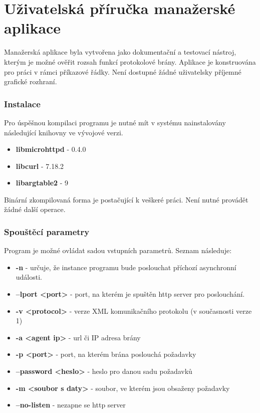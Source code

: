 \chapter{Uživatelská příručka manažerské aplikace}
\label{kap_uzivatelska_prirucka_manazer}
Manažerská aplikace byla vytvořena jako dokumentační a testovací nástroj, kterým je možné
ověřit rozsah funkcí protokolové brány. Aplikace je konstruována pro práci v rámci
příkazové řádky. Není dostupné žádné uživatelsky příjemné grafické rozhraní.

\subsection*{Instalace}
Pro úspěšnou kompilaci programu je nutné mít v systému nainstalovány následující knihovny ve vývojové verzi.
\begin{itemize}
	\item \textbf{libmicrohttpd} - 0.4.0
	\item \textbf{libcurl} - 7.18.2
	\item \textbf{libargtable2} - 9
\end{itemize}

Binární zkompilovaná forma je postačující k veškeré práci. Není nutné provádět žádné další operace.

\subsection*{Spouštěcí parametry}
Program je možné ovládat sadou vstupních parametrů. Seznam následuje:
\begin{itemize}
	\item \textbf{-n} - určuje, že instance programu bude poslouchat příchozí asynchronní události.
	\item \textbf{--lport <port>} - port, na kterém je spuštěn http server pro poslouchání.
	\item \textbf{-v <protocol>} - verze XML komunikačního protokolu (v současnosti verze 1)
	\item \textbf{-a <agent ip>} - url či IP adresa brány
	\item \textbf{-p <port>} - port, na kterém brána poslouchá požadavky
	\item \textbf{--password <heslo>} - heslo pro danou sadu požadavků
	\item \textbf{-m <soubor s daty>} - soubor, ve kterém jsou obsaženy požadavky
	\item \textbf{--no-listen} - nezapne se http server
\end{itemize}


